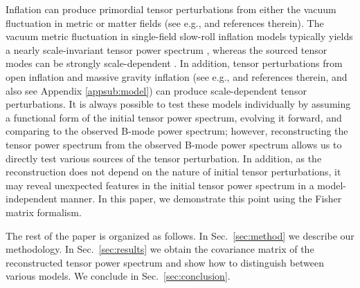 \documentclass[tightenlines,floats,aps,nofootinbib,prd,onecolumn,preprintnumbers]{revtex4}
\begin{document}
Inflation can produce primordial tensor perturbations
from either the vacuum fluctuation in metric \cite{Starobinsky:1979ty} or matter
fields (see e.g., \cite{Dimastrogiovanni:2016fuu} and references
therein). The vacuum metric fluctuation in single-field slow-roll inflation
models typically yields a nearly scale-invariant tensor power spectrum
\cite{Abbott:1984fp}, whereas the sourced
tensor modes can be strongly scale-dependent
\cite{Dimastrogiovanni:2016fuu}. In addition, tensor perturbations from
open inflation \cite{Tanaka:1997kq} 
and massive gravity inflation (see e.g., \cite{Domenech:2017kno} and 
references therein, and also see Appendix \ref{appsub:model}) can 
produce scale-dependent tensor perturbations. 
It is always possible to test these models individually by assuming
a functional form of the initial tensor power spectrum, evolving it
forward, and comparing to the observed B-mode power spectrum; however,
reconstructing the tensor power spectrum from the observed B-mode power
spectrum allows us to directly test various sources of the tensor
perturbation. In addition, as the reconstruction does not depend on the
nature of initial tensor perturbations, it may reveal unexpected
features in the initial tensor power spectrum in a model-independent
manner. In this paper, we demonstrate this point using the Fisher matrix
formalism.

The rest of the paper is organized as follows. In Sec.~\ref{sec:method}
we describe our methodology. In Sec.~\ref{sec:results} we obtain the
covariance matrix of the reconstructed tensor power spectrum and show
how to distinguish between various models. We conclude in
Sec.~\ref{sec:conclusion}.

\end{document}
